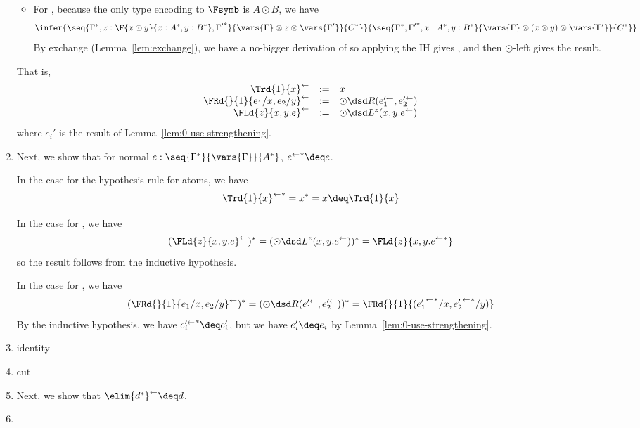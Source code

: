 \begin{enumerate}
\begin{itemize}
\item For \FL, because the only type encoding to $\Fsymb$ is $A \odot
  B$, we have
\[
\infer{\seq{\Gamma^*,z:\F{x \odot y}{x:A^*,y:B^*},{\Gamma'}^*}{\vars{\Gamma} \otimes z \otimes \vars{\Gamma'}}{C^*}}
      {\seq{\Gamma^*,{\Gamma'}^*,x:A^*,y:B^*}{\vars{\Gamma} \otimes (x \otimes y) \otimes \vars{\Gamma'}}{C^*}}
\]
By exchange (Lemma~\ref{lem:exchange}), we have a no-bigger derivation
of
{} 
so applying the IH gives 
, and then $\odot$-left gives the result.

\end{itemize}

That is,
\[
\begin{array}{rcl}
\backtrf{\Trd{1}{x}} & := & x\\
\backtrf{\FRd{}{1}{e_1/x,e_2/y}} & := & \dotRd{\backtrf{e_1'}}{\backtrf{e_2'}}\\
\backtrf{\FLd{z}{x,y.e}} & := & \dotLd{z}{x,y.\backtrf{e}}\\
\end{array}
\]
where $e_i'$ is the result of Lemma~\ref{lem:0-use-strengthening}.  

\item Next, we show that for normal $e :
  \seq{\Gamma^*}{\vars{\Gamma}}{A^*}$, ${\backtrf{e}}^* \deq e$.

In the case for the hypothesis rule for atoms, we have
\[
{\backtrf{\Trd{1}{x}}}^* = x^* = x \deq \Trd{1}{x}
\]

In the case for \FL, we have 
\[
(\backtrf{\FLd{z}{x,y.e}})^* = (\dotLd{z}{x,y.\backtrf{e}})^* =
{\FLd{z}{x,y.{\backtrf{e}}^*}}
\]
so the result follows from the inductive hypothesis.  

In the case for \FR, we have
\[
(\backtrf{\FRd{}{1}{e_1/x,e_2/y}})^* = (\dotRd{\backtrf{e_1'}}{\backtrf{e_2'}})^* =
{\FRd{}{1}{({\backtrf{{e_1'}}}^*/x,{\backtrf{{e_2'}}}^*/y)}}
\]
By the inductive hypothesis, we have 
${\backtrf{e_i'}}^* \deq e_i'$, but we have $e_i' \deq e_i$ by
Lemma~\ref{lem:0-use-strengthening}.  

\item identity 
\item cut
\item Next, we show that $\backtrf{{\elim{d^*}}} \deq d$.  
\item 
\end{enumerate}
